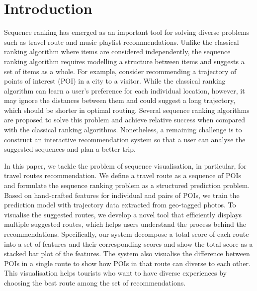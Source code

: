 \section{Introduction}
Sequence ranking has emerged as an important tool for solving diverse problems such as travel route and music playlist recommendations. 
Unlike the classical ranking algorithm where items are considered independently, the sequence ranking algorithm requires modelling a structure between items and suggests a set of items as a whole. 
For example, consider recommending a trajectory of points of interest (POI) in a city to a visitor. 
While the classical ranking algorithm can learn a user's preference for each individual location, however, it may ignore the distances between them and could suggest a long trajectory, which should be shorter in optimal routing. 
Several sequence ranking algorithms are proposed to solve this problem and achieve relative success when compared with the classical ranking algorithms. 
Nonetheless, a remaining challenge is to construct an interactive recommendation system so that a user can analyse the suggested sequences and plan a better trip.

In this paper, we tackle the problem of sequence visualisation, in particular, for travel routes recommendation. 
We define a travel route as a sequence of POIs and formulate the sequence ranking problem as a structured prediction problem. 
Based on hand-crafted features for individual and pairs of POIs, we train the prediction model with trajectory data extracted from geo-tagged photos. 
To visualise the suggested routes, we develop a novel tool that efficiently displays multiple suggested routes, which helps users understand the process behind the recommendations.
Specifically, our system decompose a total score of each route into a set of features and their corresponding scores and show the total score as a stacked bar plot of the features.
The system also visualise the difference between POIs in a single route to show how POIs in that route can diverse to each other. 
This visualisation helps tourists who want to have diverse experiences by choosing the best route among the set of recommendations.